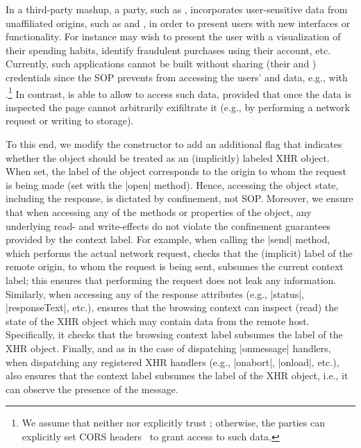 In a third-party mashup, a party, such as ,
incorporates user-sensitive data from unaffiliated origins, such as
 and , in order to present users with new
interfaces or functionality.
%
For instance  may wish to present the user with a
visualization of their spending habits, identify fraudulent
 purchases using their  account, etc.
%
Currently, such applications cannot be built without sharing (their
 and ) credentials since the SOP
prevents  from accessing the users' 
and  data, e.g., with \xhr{}.\footnote{
 We assume that neither  nor 
 explicitly trust ; otherwise, the parties can
 explicitly set CORS headers~\cite{cors13} to grant 
 access to such data.
}
%
In contrast, \sys{} is able to allow  to access such
data, provided that once the data is inspected the page cannot
arbitrarily exifiltrate it (e.g., by performing a network request or
writing to storage).
 
To this end, we modify the \xhr{} constructor to add an additional
flag that indicates whether the object should be treated as an
(implicitly) labeled XHR object.
%
When set, the  label of the object corresponds to the origin
to whom the request is being made (set with the \js|open| method). 
%
Hence, accessing the object state, including the response, is dictated by
confinement, not SOP.
%
Moreover, we ensure that when accessing any of the methods or
properties of the object, any underlying read- and write-effects do
not violate the confinement guarantees provided by the context label.
%
For example, when calling the \js|send| method, which performs the
actual network request, \sys{} checks that the (implicit) label of the
remote origin, to whom the request is being sent, subsumes the current
context label;
%
this ensures that performing the request does not leak any
information.
%
Similarly, when accessing any of the response attributes (e.g.,
\js|status|, \js|responseText|, etc.), \sys{} ensures that the
browsing context can inspect (read) the state of the XHR object which
may contain data from the remote host.
%
Specifically, it checks that the browsing context label subsumes the
label of the XHR object.
%
Finally, and as in the case of dispatching \js|onmessage| handlers,
when dispatching any registered XHR
handlers (e.g., \js|onabort|, \js|onload|, etc.), \sys{} also ensures
that the context label subsumes the label of the XHR object, i.e., it
can observe the presence of the message.
 
